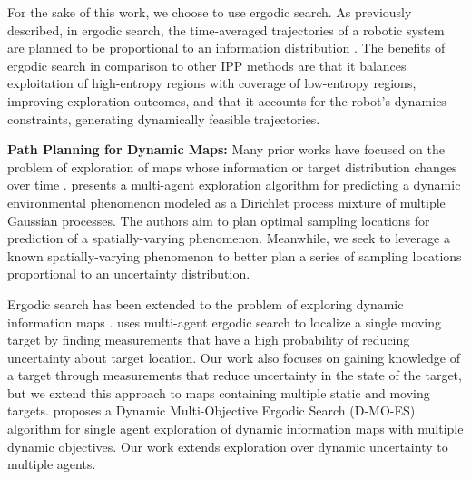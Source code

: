 \documentclass[letterpaper, 10 pt, conference]{ieeeconf}  %
\begin{document}
For the sake of this work, we choose to use ergodic search. As previously described, in ergodic search, the time-averaged trajectories of a robotic system are planned to be proportional to an information distribution \cite{mathew2011metrics}. The benefits of ergodic search in comparison to other IPP methods are that it balances exploitation of high-entropy regions with coverage of low-entropy regions, improving exploration outcomes, and that it accounts for the robot's dynamics constraints, generating dynamically feasible trajectories.

\textbf{Path Planning for Dynamic Maps:}
Many prior works have focused on the problem of exploration of maps whose information or target distribution changes over time \cite{singh2009nonmyopic} \cite{liu2018novel} \cite{yao2015real}. 
\cite{ouyang2014multi} presents a multi-agent exploration algorithm for predicting a dynamic environmental phenomenon modeled as a Dirichlet process mixture of multiple Gaussian processes. The authors aim to plan optimal sampling locations for prediction of a spatially-varying phenomenon. Meanwhile, we seek to leverage a known spatially-varying phenomenon to better plan a series of sampling locations proportional to an uncertainty distribution. 

Ergodic search has been extended to the problem of exploring dynamic information maps \cite{miller2015ergodic} \cite{candela2021using} \cite{wittemyer2023bi}. \cite{coffin2022multi} uses multi-agent ergodic search to localize a single moving target by finding measurements that have a high probability of reducing uncertainty about target location. Our work also focuses on gaining knowledge of a target through measurements that reduce uncertainty in the state of the target, but we extend this approach to maps containing multiple static and moving targets. \cite{rao2023multi} proposes a Dynamic Multi-Objective Ergodic Search (D-MO-ES) algorithm for single agent exploration of dynamic information maps with multiple dynamic objectives. Our work extends exploration over dynamic uncertainty to multiple agents.
\end{document}
